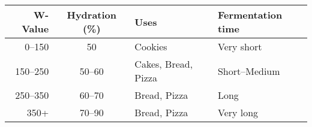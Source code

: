 \begin{tabular}{@{}rcll@{}}
\toprule
\textbf{W-Value} & \textbf{Hydration (\%)} & \textbf{Uses} & \textbf{Fermentation time} \\ \midrule
0--150          & 50     & Cookies             & Very short    \\ 
150--250        & 50--60 & Cakes, Bread, Pizza & Short--Medium \\ 
250--350        & 60--70 & Bread, Pizza        & Long          \\ 
350+            & 70--90 & Bread, Pizza        & Very long     \\ \bottomrule
\end{tabular}
